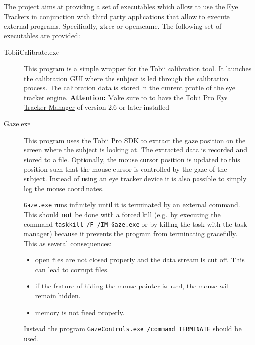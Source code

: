 \documentclass[a4paper,oneside]{book}
\begin{document}
The project aims at providing a set of executables which allow to use the Eye Trackers in conjunction with third party applications that allow to execute external programs.
Specifically, \href{http://www.ztree.uzh.ch/en.html}{ztree} or \href{https://osdoc.cogsci.nl/3.3/}{openseame}.
The following set of executables are provided:
\begin{description}
    \item[TobiiCalibrate.exe] This program is a simple wrapper for the Tobii calibration tool.
        It launches the calibration GUI where the subject is led through the calibration process.
        The calibration data is stored in the current profile of the eye tracker engine.
        \textbf{Attention:} Make sure to to have the \href{https://www.tobii.com/products/software/applications-and-developer-kits/tobii-pro-eye-tracker-manager}{Tobii Pro Eye Tracker Manager} of version 2.6 or later installed.
    \item[Gaze.exe] This program uses the \href{http://developer.tobii.com/tobii-pro-sdk/}{Tobii Pro SDK} to extract the gaze position on the screen where the subject is looking at.
        The extracted data is recorded and stored to a file.
        Optionally, the mouse cursor position is updated to this position such that the mouse cursor is controlled by the gaze of the subject.
        Instead of using an eye tracker device it is also possible to simply log the mouse coordinates.

        \texttt{Gaze.exe} runs infinitely until it is terminated by an external command.
        This should \textbf{not} be done with a forced kill (e.g.~by executing the command \texttt{taskkill /F /IM Gaze.exe} or by killing the task with the task manager) because it prevents the program from terminating gracefully.
        This as several consequences:
        \begin{itemize}
            \item open files are not closed properly and the data stream is cut off. This can lead to corrupt files.
            \item if the feature of hiding the mouse pointer is used, the mouse will remain hidden.
            \item memory is not freed properly.
        \end{itemize}
        Instead the program \texttt{GazeControls.exe /command TERMINATE} should be used.


\end{description}
\end{document}
